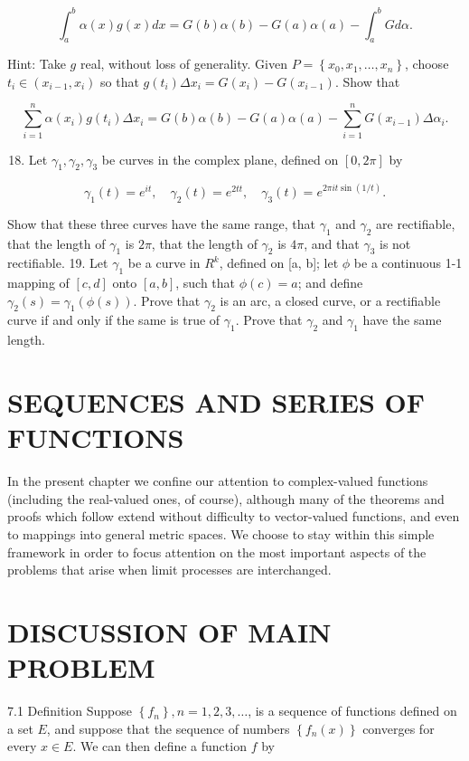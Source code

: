 \documentclass[10pt]{article}
\begin{document}
$$
\int_{a}^{b} \alpha(x) g(x) d x=G(b) \alpha(b)-G(a) \alpha(a)-\int_{a}^{b} G d \alpha .
$$

Hint: Take $g$ real, without loss of generality. Given $P=\left\{x_{0}, x_{1}, \ldots, x_{n}\right\}$, choose $t_{i} \in\left(x_{i-1}, x_{i}\right)$ so that $g\left(t_{i}\right) \Delta x_{i}=G\left(x_{i}\right)-G\left(x_{i-1}\right)$. Show that

$$
\sum_{i=1}^{n} \alpha\left(x_{i}\right) g\left(t_{i}\right) \Delta x_{i}=G(b) \alpha(b)-G(a) \alpha(a)-\sum_{i=1}^{n} G\left(x_{i-1}\right) \Delta \alpha_{i} .
$$

\begin{enumerate}
  \setcounter{enumi}{17}
  \item Let $\gamma_{1}, \gamma_{2}, \gamma_{3}$ be curves in the complex plane, defined on $[0,2 \pi]$ by
\end{enumerate}

$$
\gamma_{1}(t)=e^{i t}, \quad \gamma_{2}(t)=e^{2 t t}, \quad \gamma_{3}(t)=e^{2 \pi i t \sin (1 / t)} .
$$

Show that these three curves have the same range, that $\gamma_{1}$ and $\gamma_{2}$ are rectifiable, that the length of $\gamma_{1}$ is $2 \pi$, that the length of $\gamma_{2}$ is $4 \pi$, and that $\gamma_{3}$ is not rectifiable. 19. Let $\gamma_{1}$ be a curve in $R^{k}$, defined on [a, b]; let $\phi$ be a continuous 1-1 mapping of $[c, d]$ onto $[a, b]$, such that $\phi(c)=a$; and define $\gamma_{2}(s)=\gamma_{1}(\phi(s))$. Prove that $\gamma_{2}$ is an arc, a closed curve, or a rectifiable curve if and only if the same is true of $\gamma_{1}$. Prove that $\gamma_{2}$ and $\gamma_{1}$ have the same length.

\section{SEQUENCES AND SERIES OF FUNCTIONS}
In the present chapter we confine our attention to complex-valued functions (including the real-valued ones, of course), although many of the theorems and proofs which follow extend without difficulty to vector-valued functions, and even to mappings into general metric spaces. We choose to stay within this simple framework in order to focus attention on the most important aspects of the problems that arise when limit processes are interchanged.

\section{DISCUSSION OF MAIN PROBLEM}
7.1 Definition Suppose $\left\{f_{n}\right\}, n=1,2,3, \ldots$, is a sequence of functions defined on a set $E$, and suppose that the sequence of numbers $\left\{f_{n}(x)\right\}$ converges for every $x \in E$. We can then define a function $f$ by
\end{document}
